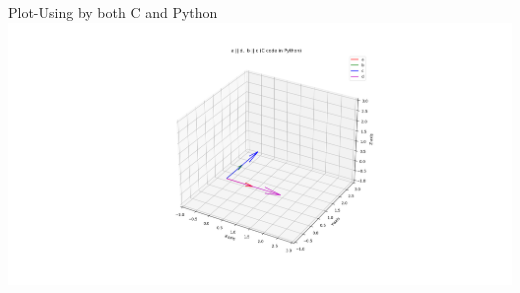 \documentclass{beamer}
\begin{document}
\begin{frame}{Plot-Using by both C and Python}
    \centering
    \includegraphics[width=\columnwidth, height=0.8\textheight, keepaspectratio]{figs/fig5.1.png}     
\end{frame}
\end{document}
